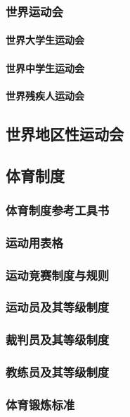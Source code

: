 \documentclass[UTF8]{../../ApplicationUniverse}
\begin{document}
        \subsubsection{世界运动会}
            \paragraph{世界大学生运动会}
            \paragraph{世界中学生运动会}
            \paragraph{世界残疾人运动会}
    \subsection{世界地区性运动会}


    \subsection{体育制度}
        \subsubsection{体育制度参考工具书}
        \subsubsection{运动用表格}
        \subsubsection{运动竞赛制度与规则}
        \subsubsection{运动员及其等级制度}
        \subsubsection{裁判员及其等级制度}
        \subsubsection{教练员及其等级制度}
        \subsubsection{体育锻炼标准}
\end{document}
